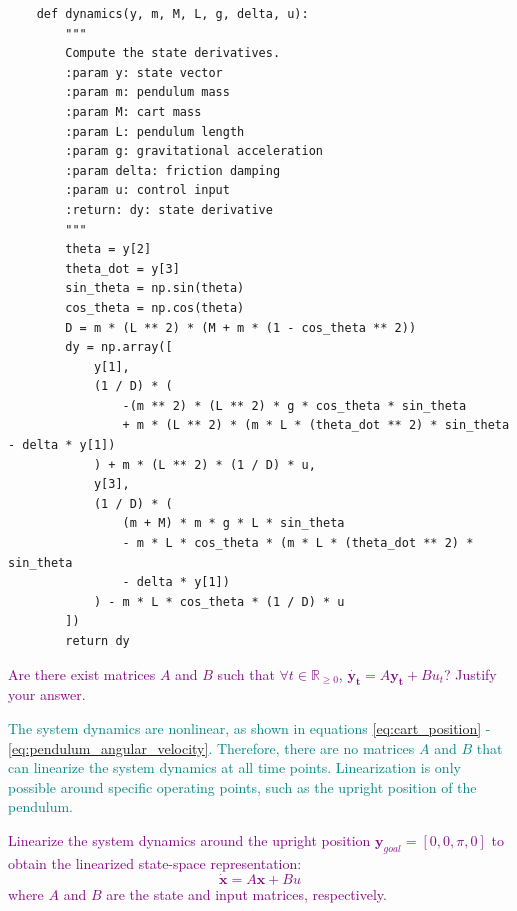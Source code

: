 \documentclass[a4 paper]{article}
\begin{document}
\begin{verbatim}
    def dynamics(y, m, M, L, g, delta, u):
        """
        Compute the state derivatives.
        :param y: state vector
        :param m: pendulum mass
        :param M: cart mass
        :param L: pendulum length
        :param g: gravitational acceleration
        :param delta: friction damping
        :param u: control input
        :return: dy: state derivative
        """
        theta = y[2]
        theta_dot = y[3]
        sin_theta = np.sin(theta)
        cos_theta = np.cos(theta)
        D = m * (L ** 2) * (M + m * (1 - cos_theta ** 2))    
        dy = np.array([
            y[1],
            (1 / D) * (
                -(m ** 2) * (L ** 2) * g * cos_theta * sin_theta 
                + m * (L ** 2) * (m * L * (theta_dot ** 2) * sin_theta - delta * y[1])
            ) + m * (L ** 2) * (1 / D) * u,
            y[3],
            (1 / D) * (
                (m + M) * m * g * L * sin_theta 
                - m * L * cos_theta * (m * L * (theta_dot ** 2) * sin_theta 
                - delta * y[1])
            ) - m * L * cos_theta * (1 / D) * u
        ])
        return dy
\end{verbatim}


\medbreak

\textcolor{purple}{
     Are there exist matrices $A$ and $B$ such that $\forall t \in \mathbb{R}_{\geq 0}$,  $\dot{\mathbf{y_t}} = A \mathbf{y_t} + B u_t $? Justify your answer.
}

\medbreak

\textcolor{teal}{
    The system dynamics are nonlinear, as shown in equations \ref{eq:cart_position} - \ref{eq:pendulum_angular_velocity}. 
    Therefore, there are no matrices \( A \) and \( B \) that can linearize the system dynamics at all time points. 
    Linearization is only possible around specific operating points, such as the upright position of the pendulum. 
}

\medbreak

\textcolor{purple}{
     Linearize the system dynamics around the upright position \( \textbf{y}_{goal} = [0, 0, \pi, 0] \) to obtain the linearized state-space representation:
    \begin{equation*}
        \dot{\mathbf{x}} = A \mathbf{x} + B u
    \end{equation*}
    where \( A \) and \( B \) are the state and input matrices, respectively. 
}

\medbreak
\end{document}
